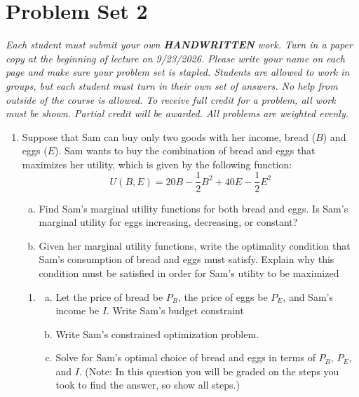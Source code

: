 \documentclass[11pt]{article}
\begin{document}
  
\section*{Problem Set 2}

\emph{Each student must submit your own \textbf{HANDWRITTEN} work. Turn in a paper copy at the beginning of lecture on 9/23/2026.  Please write your name on each page and make sure your problem set is stapled.  Students are allowed to work in groups, but each student must turn in their own set of answers.  No help from outside of the course is allowed.  To receive full credit for a problem, all work must be shown.  Partial credit will be awarded.  All problems are weighted evenly.}


\begin{enumerate}
  \item Suppose that Sam can buy only two goods with her income, bread ($B$) and eggs ($E$). Sam wants to buy the combination of bread and eggs that maximizes her utility, which is given by the following function:
  $$ 
    U(B,E) = 20B - \frac{1}{2} B^2 + 40E - \frac{1}{2} E^2
  $$

  \begin{enumerate}[(a)]
    \item Find Sam's marginal utility functions for both bread and eggs. Is Sam's marginal utility for eggs increasing, decreasing, or constant?
    

    \vspace*{80mm}
    \item Given her marginal utility functions, write the optimality condition that Sam's consumption of bread and eggs must satisfy. Explain why this condition must be satisfied in order for Sam's utility to be maximized
  
  \end{enumerate}

  
\newpage

\begin{enumerate}
  \item[] 
  \begin{enumerate}[(a)] 
    \item[(c)] Let the price of bread be $P_B$, the price of eggs be $P_E$, and Sam's income be $I$.  Write Sam's budget constraint

    \vspace*{20mm}
	\item[(d)] Write Sam's constrained optimization problem.    
    
    \vspace*{25mm}
    \item[(e)] Solve for Sam's optimal choice of bread and eggs in terms of $P_B$, $P_E$, and $I$. (Note: In this question you will be graded on the steps you took to find the answer, so show all steps.)
    

\end{enumerate}
\end{enumerate}
\end{enumerate}
\end{document}
